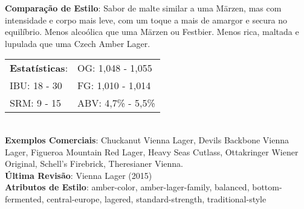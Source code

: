 \textbf{Comparação de Estilo}: Sabor de malte similar a uma Märzen, mas com intensidade e corpo mais leve, com um toque a mais de amargor e secura no equilíbrio. Menos alcoólica que uma Märzen ou Festbier. Menos rica, maltada e lupulada que uma Czech Amber Lager. \\
\begin{tabular}{@{}p{35mm}p{35mm}@{}}
  \textbf{Estatísticas}: & OG: 1,048 - 1,055 \\
  IBU: 18 - 30 & FG: 1,010 - 1,014 \\
  SRM: 9 - 15 & ABV: 4,7\% - 5,5\%
\end{tabular}\\
\textbf{Exemplos Comerciais}: Chuckanut Vienna Lager, Devils Backbone Vienna Lager, Figueroa Mountain Red Lager, Heavy Seas Cutlass, Ottakringer Wiener Original, Schell’s Firebrick, Theresianer Vienna. \\
\textbf{Última Revisão}: Vienna Lager (2015) \\
\textbf{Atributos de Estilo}: amber-color, amber-lager-family, balanced, bottom-fermented, central-europe, lagered, standard-strength, traditional-style
